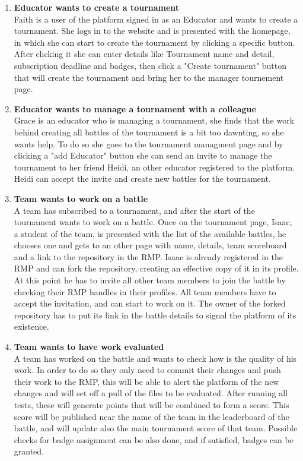 \begin{enumerate}[label=$\bullet$ \textbf{SC\arabic*:}]
    \item \textbf{Educator wants to create a tournament}\\ Faith is a user of the platform signed in as an Educator and wants to create a tournament. She logs in to the website and is presented with the homepage, in which she can start to create the tournament by clicking a specific button. After clicking it she can enter details like Tournament name and detail, subscription deadline and badges, then click a "Create tournament" button that will create the tournament and bring her to the manager tournement page. 
    \item \textbf{Educator wants to manage a tournament with a colleague}\\ Grace is an educator who is managing a tournament, she finds that the work behind creating all battles of the tournament is a bit too dawnting, so she wants help. To do so she goes to the tournament managment page and by clicking a "add Educator" button she can send an invite to manage the tournament to her friend Heidi, an other educator registered to the platform. Heidi can accept the invite and create new battles for the tournament.
    \item \textbf{Team wants to work on a battle}\\ A team has subscribed to a tournament, and after the start of the tournament wants to work on a battle. Once on the tournament page, Isaac, a student of the team, is presented with the list of the available battles, he chooses one and gets to an other page with name, details, team scoreboard and a link to the repository in the RMP. Isaac is already registered in the RMP and can fork the repository, creating an effective copy of it in its profile. At this point he has to invite all other team members to join the battle by checking their RMP handles in their profiles. All team members have to accept the invitation, and can start to work on it. The owner of the forked repository has to put its link in the battle details to signal the platform of its existence.
    \item \textbf{Team wants to have work evaluated}\\ A team has worked on the battle and wants to check how is the quality of his work. In order to do so they only need to commit their changes and push their work to the RMP, this will be able to alert the platform of the new changes and will set off a pull of the files to be evaluated. After running all tests, these will generate points that will be combined to form a score. This score will be published near the name of the team in the leaderboard of the battle, and will update also the main tournament score of that team. Possible checks for badge assignment can be also done, and if satisfied, badges can be granted.

\end{enumerate}
